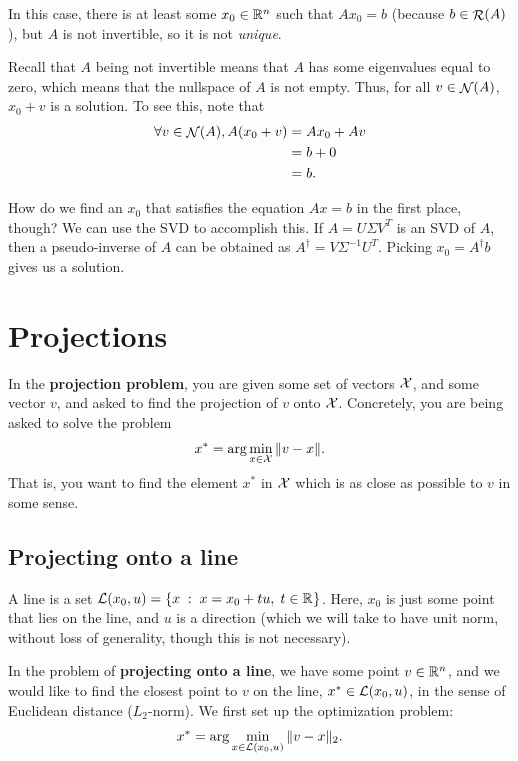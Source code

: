 \documentclass[12pt]{article}
\begin{document}
In this case, there is at least some $x_0 \in { {\mathbb R}^{n} }$ such that $Ax_0 = b$ (because $b \in \mathop{\mathcal{R}}\nolimits(A)$), but $A$ is not invertible, so it is not \textit{unique}. 

Recall that $A$ being not invertible means that $A$ has some eigenvalues equal to zero, which means that the nullspace of $A$ is not empty. Thus, for all $v \in \mathop{\mathcal{N}}\nolimits(A)$, $x_0 + v$ is a solution. To see this, note that
%
\begin{align*}
\forall v \in \mathop{\mathcal{N}}\nolimits(A), A(x_0 + v) &= Ax_0 + Av \\
&= b + 0 \\
&= b.
\end{align*}

How do we find an $x_0$ that satisfies the equation $Ax=b$ in the first place, though? We can use the SVD to accomplish this. If $A = U\Sigma V^T$ is an SVD of $A$, then a pseudo-inverse of $A$ can be obtained as $A^\dagger = V\Sigma^{-1} U^T$. Picking $x_0 = A^{\dagger} b$ gives us a solution.

\pagebreak

\section{Projections}

In the \textbf{projection problem}, you are given some set of vectors ${\mathcal X}$, and some vector $v$, and asked to find the projection of $v$ onto ${\mathcal X}$. Concretely, you are being asked to solve the problem
%
\begin{equation*}
x^* = \arg \min_{x \in {\mathcal X}} \|v - x\|.
\end{equation*}
%
That is, you want to find the element $x^*$ in ${\mathcal X}$ which is as close as possible to $v$ in some sense. 

\subsection{Projecting onto a line}

A line is a set ${\mathcal L}(x_0, u) = \{x \; : \; x = x_0 + t u, \; t \in { {\mathbb R}^{} }\}$. Here, $x_0$ is just some point that lies on the line, and $u$ is a direction (which we will take to have unit norm, without loss of generality, though this is not necessary). 

In the problem of \textbf{projecting onto a line}, we have some point $v \in { {\mathbb R}^{n} }$, and we would like to find the closest point to $v$ on the line, $x^* \in {\mathcal L}(x_0, u)$, in the sense of Euclidean distance ($L_2$-norm). We first set up the optimization problem:
%
\begin{equation*}
x^* = \arg \min_{x \in {\mathcal L}(x_0, u)} \|v - x\|_2.
\end{equation*}
\end{document}

